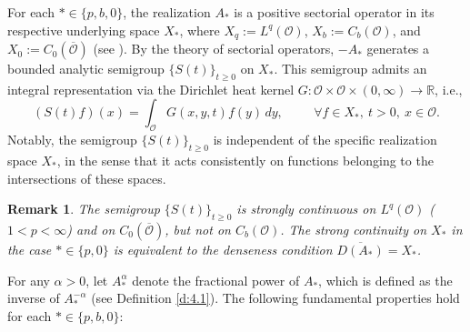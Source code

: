 \documentclass[10pt]{article}
\numberwithin{figure}{section}
\numberwithin{equation}{section}
\newtheorem{remark}[theorem]{Remark}
\newcommand{\0}{{\theta}}
\def\be{\begin{equation}}
\def\ee{\end{equation}}
\def\Hs{\hspace{1cm}}\def\hs{\hspace{0.5cm}}
\begin{document}
For each $*\in \{p,b,0\}$, the realization $A_*$ is a positive sectorial operator in its respective underlying space $X_*$, where $X_q:=L^q(\mathcal{O})$, $X_b:=C_b(\mathcal{O})$, and $X_0:=C_0(\overline{\mathcal{O}})$ (see \cite[Corollary 3.1.21 (ii)]{Lu}). By the theory of sectorial operators, $-A_*$ generates a bounded analytic semigroup $\{S(t)\}_{t\ge 0}$ on $X_*$. This semigroup admits an integral representation via the Dirichlet heat kernel $G:\mathcal{O}\times \mathcal{O}\times (0,\infty)\to \mathbb{R}$, i.e.,
\be\label{eq2.1}
(S(t)f)(x)=\int_{\mathcal{O}} G(x,y,t)f(y)\,dy,\Hs \forall f\in X_*, \ t>0, \ x\in \mathcal{O}.
\ee
Notably, the semigroup $\{S(t)\}_{t\ge 0}$ is independent of the specific realization space $X_*$, in the sense that it acts consistently on functions belonging to the intersections of these spaces.
\begin{remark}\cite{Pazy}
The semigroup $\{S(t)\}_{t\ge0}$ is strongly continuous on $L^q (\mathcal{O})$ ($1<p<\infty$) and on $C_0(\overline{\mathcal{O}})$, but not on $C_b(\mathcal{O})$. The strong continuity on $X_*$ in the case $*\in\{p,0\}$ is equivalent to the denseness condition $\overline{D(A_*)}=X_*$.
\end{remark}
\vs
For any $\alpha>0$, let $A_*^\alpha$ denote the fractional power of $A_*$, which is defined as the inverse of $A_*^{-\alpha}$ (see Definition \ref{d:4.1}). The following fundamental properties hold for each $*\in \{p,b,0\}$:
\end{document}
